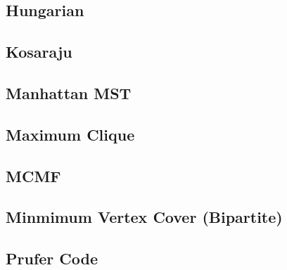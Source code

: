 \subsection{Hungarian}
\vspace{-2ex}
\raggedbottom
\vspace{-3.2ex}
\hrulefill
\subsection{Kosaraju}
\vspace{-2ex}
\raggedbottom
\vspace{-3.2ex}
\hrulefill
\subsection{Manhattan MST}
\vspace{-2ex}
\raggedbottom
\vspace{-3.2ex}
\hrulefill
\subsection{Maximum Clique}
\vspace{-2ex}
\raggedbottom
\vspace{-3.2ex}
\hrulefill
\subsection{MCMF}
\vspace{-2ex}
\raggedbottom
\vspace{-3.2ex}
\hrulefill
\subsection{Minmimum Vertex Cover (Bipartite)}
\vspace{-2ex}
\raggedbottom
\vspace{-3.2ex}
\hrulefill
\subsection{Prufer Code}
\vspace{-2ex}
\raggedbottom
\vspace{-3.2ex}
\hrulefill

